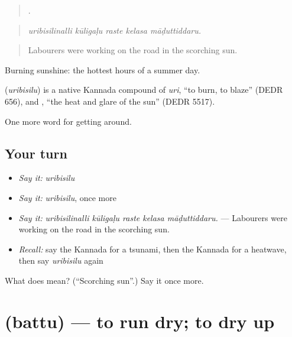 \begin{quote}
    .
\end{quote}

\begin{quote}
\emph{uribisilinalli kūligaḷu raste kelasa māḍuttiddaru.}
\end{quote}

\begin{quote}
Labourers were working on the road in the scorching sun.
\end{quote}

Burning sunshine: the hottest hours of a summer day.

\begin{cousinweb}
\textbf{} (\emph{uribisilu}) is a native Kannada compound of \emph{uri}, \textquotedblleft{}to burn, to blaze\textquotedblright{} (DEDR 656), and , \textquotedblleft{}the heat and glare of the sun\textquotedblright{} (DEDR 5517).
\end{cousinweb}

\begin{grammarlens}[title={What you've built}]
One more word for getting around.
\end{grammarlens}

\subsection*{Your turn}
\begin{itemize}
\raggedright
  \item \emph{Say it:} \emph{uribisilu}
  \item \emph{Say it:} \emph{uribisilu}, once more
  \item \emph{Say it:} \emph{uribisilinalli kūligaḷu raste kelasa māḍuttiddaru.} — Labourers were working on the road in the scorching sun.
  \item \emph{Recall:} say the Kannada for a tsunami, then the Kannada for a heatwave, then say \emph{uribisilu} again
\end{itemize}

\begin{tcolorbox}[breakable,colback=teal!4,colframe=teal!35!black,title={Before you move on}]
What does  mean? (\textquotedblleft{}Scorching sun\textquotedblright{}.) Say it once more.
\end{tcolorbox}
\section[\texorpdfstring{\kn{ಬತ್ತು} (battu)}{ಬತ್ತು (battu)}]{ (battu) — to run dry; to dry up}


